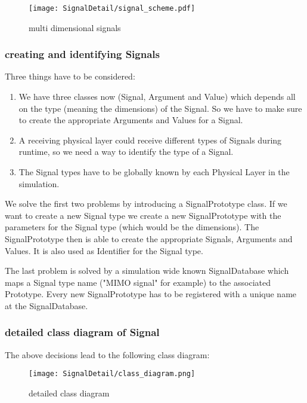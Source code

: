 \begin{figure}[H]
 \centering
 \texttt{[image: SignalDetail/signal\_scheme.pdf]}
 \caption{multi dimensional signals}
 \label{fig:signalscheme}
\end{figure}

\subsubsection{creating and identifying Signals}

Three things have to be considered:

\begin{enumerate}
\item We have three classes now (Signal, Argument and Value) which depends all on the type (meaning the dimensions) of the Signal. So we have to make sure to create the appropriate Arguments and Values for a Signal.
\item A receiving physical layer could receive different types of Signals during runtime, so we need a way to identify the type of a Signal.
\item The Signal types have to be globally known by each Physical Layer in the simulation.
\end{enumerate}

We solve the first two problems by introducing a SignalPrototype class. If we want to create a new Signal type we create a new SignalPrototype with the parameters for the Signal type (which would be the dimensions). The SignalPrototype then is able to create the appropriate Signals, Arguments and Values. It is also used as Identifier for the Signal type.

The last problem is solved by a simulation wide known SignalDatabase which maps  a Signal type name ("MIMO signal" for example) to the associated Prototype. Every new SignalPrototype has to be registered with a unique name at the SignalDatabase. 

\subsubsection{detailed class diagram of Signal}

The above decisions lead to the following class diagram:

\begin{figure}[H]
 \centering
 \texttt{[image: SignalDetail/class\_diagram.png]}
 \caption{detailed class diagram}
 \label{fig: signal classgraph}
\end{figure}

